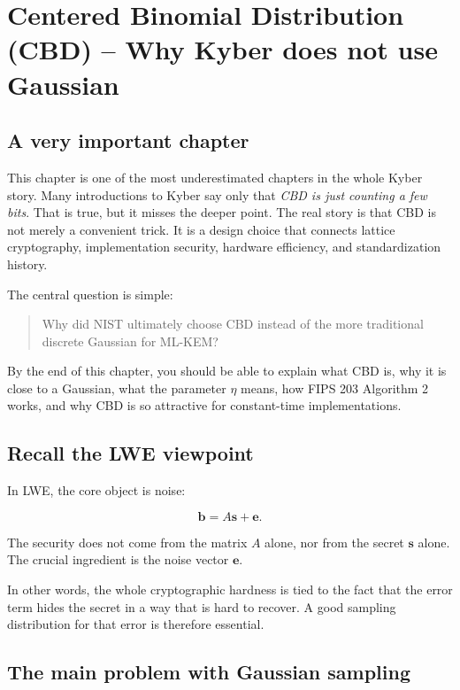 \chapter{Centered Binomial Distribution (CBD) -- Why Kyber does not use Gaussian}
\label{ch:cbd}

\section{A very important chapter}

This chapter is one of the most underestimated chapters in the whole Kyber story.
Many introductions to Kyber say only that\textit{ CBD is just counting a few bits}. That is true, but it misses the deeper point.
The real story is that CBD is not merely a convenient trick. It is a design choice that connects lattice cryptography, implementation security, hardware efficiency, and standardization history.

The central question is simple:

\begin{quote}
Why did NIST ultimately choose CBD instead of the more traditional discrete Gaussian for ML-KEM?
\end{quote}

By the end of this chapter, you should be able to explain what CBD is, why it is close to a Gaussian, what the parameter \(\eta\) means, how FIPS 203 Algorithm 2 works, and why CBD is so attractive for constant-time implementations.

\section{Recall the LWE viewpoint}

In LWE, the core object is noise:

\[
\mathbf{b}=A\mathbf{s}+\mathbf{e}.
\]

The security does not come from the matrix \(A\) alone, nor from the secret \(\mathbf{s}\) alone. The crucial ingredient is the noise vector \(\mathbf{e}\).

In other words, the whole cryptographic hardness is tied to the fact that the error term hides the secret in a way that is hard to recover. A good sampling distribution for that error is therefore essential.

\section{The main problem with Gaussian sampling}

